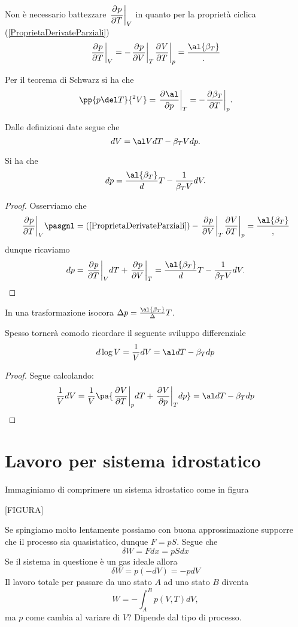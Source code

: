 \begin{remark}
Non \`e necessario battezzare $\displaystyle\ppb TpV$ in quanto per la propriet\`a ciclica (\ref{ProprietaDerivateParziali})
\[\ppb TpV=-\ppb VpT\ppb TVp=\frac\al{\beta_T}.\]
\end{remark}

\begin{remark}
Per il teorema di Schwarz si ha che
\[\pp{p\del T}{^2V}=\ppb p\al T=-\ppb T{\beta_T}p.\]
\end{remark}

\begin{remark}
Dalle definizioni date segue che
\[dV=\al VdT-\beta_T Vdp.\]
\end{remark}

\begin{proposition}\label{DifferenzialePressione}
Si ha che
\[dp=\frac\al{\beta_T}dT-\frac1{\beta_T V}dV.\]
\end{proposition}
\begin{proof}
Osserviamo che
\[\ppb TpV\pasgnl={(\ref{ProprietaDerivateParziali})}-\ppb VpT \ppb TVp=\frac \al{\beta_T},\]
dunque ricaviamo
\[dp=\ppb TpVdT+\ppb VpT=\frac\al{\beta_T}dT-\frac1{\beta_T V}dV.\]
\end{proof}
\begin{corollary}
In una trasformazione isocora $\Delta p=\frac\al{\beta_T}\Delta T$.
\end{corollary}

\begin{remark}\label{DifferenzialeLogaritmicoNelVolume}
Spesso torner\`a comodo ricordare il seguente sviluppo differenziale
\[d\log V=\frac1VdV=\al dT-\beta_T dp\]
\end{remark}
\begin{proof}
Segue calcolando:
\[\frac1VdV=\frac1V\pa{\ppb TVp dT+\ppb pVTdp}=\al dT-\beta_T dp\]
\end{proof}

\section{Lavoro per sistema idrostatico}
Immaginiamo di comprimere un sistema idrostatico come in figura 

[FIGURA]

\noindent
Se spingiamo molto lentamente possiamo con buona approssimazione supporre che il processo sia quasistatico, dunque $F=pS$. Segue che
\[\boxed{\delta W=Fdx=pSdx}\]
Se il sistema in questione \`e un gas ideale allora
\[\delta W=p(-dV)=-pdV\]
Il lavoro totale per passare da uno stato $A$ ad uno stato $B$ diventa
\[W=-\int_{A}^{B} p(V,T)dV,\]
ma $p$ come cambia al variare di $V$? Dipende dal tipo di processo.


